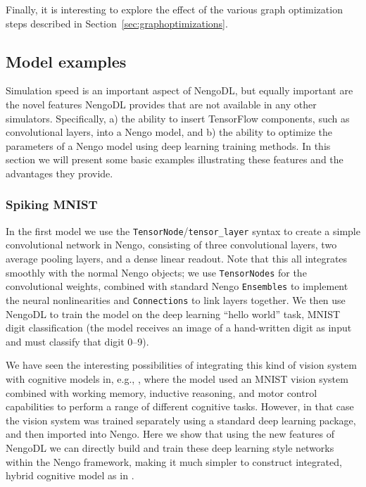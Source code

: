 \documentclass{article}
\begin{document}

Finally, it is interesting to explore the effect of the various graph optimization steps described in Section~\ref{sec:graphoptimizations}.

\subsection{Model examples}

Simulation speed is an important aspect of NengoDL, but equally important are the novel features NengoDL provides that are not available in any other simulators.  Specifically, a) the ability to insert TensorFlow components, such as convolutional layers, into a Nengo model, and b) the ability to optimize the parameters of a Nengo model using deep learning training methods.  In this section we will present some basic examples illustrating these features and the advantages they provide.

\subsubsection{Spiking MNIST}
\label{sec:spiking_mnist}

In the first model we use the \texttt{TensorNode}/\texttt{tensor\_layer} syntax to create a simple convolutional network in Nengo, consisting of three convolutional layers, two average pooling layers, and a dense linear readout.  Note that this all integrates smoothly with the normal Nengo objects; we use \texttt{TensorNodes} for the convolutional weights, combined with standard Nengo \texttt{Ensembles} to implement the neural nonlinearities and \texttt{Connections} to link layers together.  We then use NengoDL to train the model on the deep learning ``hello world'' task, MNIST digit classification (the model receives an image of a hand-written digit as input and must classify that digit 0--9).

We have seen the interesting possibilities of integrating this kind of vision system with cognitive models in, e.g., \citet{Eliasmith2012a}, where the model used an MNIST vision system combined with working memory, inductive reasoning, and motor control capabilities to perform a range of different cognitive tasks.  However, in that case the vision system was trained separately using a standard deep learning package, and then imported into Nengo.  Here we show that using the new features of NengoDL we can directly build and train these deep learning style networks within the Nengo framework, making it much simpler to construct integrated, hybrid cognitive model as in \citet{Eliasmith2012a}.
\end{document}
